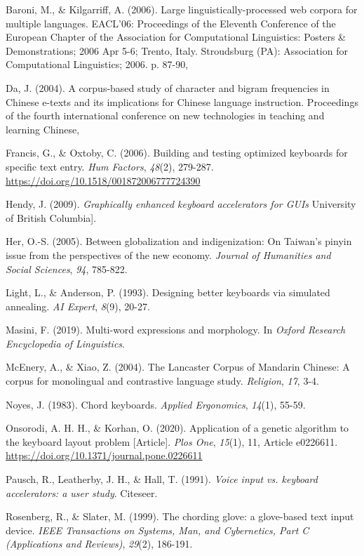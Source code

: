 Baroni, M., \& Kilgarriff, A. (2006). Large linguistically-processed web
corpora for multiple languages. EACL'06: Proceedings of the Eleventh
Conference of the European Chapter of the Association for Computational
Linguistics: Posters \& Demonstrations; 2006 Apr 5-6; Trento, Italy.
Stroudsburg (PA): Association for Computational Linguistics; 2006. p.
87-90,

Da, J. (2004). A corpus-based study of character and bigram frequencies
in Chinese e-texts and its implications for Chinese language
instruction. Proceedings of the fourth international conference on new
technologies in teaching and learning Chinese,

Francis, G., \& Oxtoby, C. (2006). Building and testing optimized
keyboards for specific text entry. \emph{Hum Factors}, \emph{48}(2),
279-287. \url{https://doi.org/10.1518/001872006777724390}

Hendy, J. (2009). \emph{Graphically enhanced keyboard accelerators for
GUIs} University of British Columbia{]}.

Her, O.-S. (2005). Between globalization and indigenization: On Taiwan's
pinyin issue from the perspectives of the new economy. \emph{Journal of
Humanities and Social Sciences}, \emph{94}, 785-822.

Light, L., \& Anderson, P. (1993). Designing better keyboards via
simulated annealing. \emph{AI Expert}, \emph{8}(9), 20-27.

Masini, F. (2019). Multi-word expressions and morphology. In
\emph{Oxford Research Encyclopedia of Linguistics}.

McEnery, A., \& Xiao, Z. (2004). The Lancaster Corpus of Mandarin
Chinese: A corpus for monolingual and contrastive language study.
\emph{Religion}, \emph{17}, 3-4.

Noyes, J. (1983). Chord keyboards. \emph{Applied Ergonomics},
\emph{14}(1), 55-59.

Onsorodi, A. H. H., \& Korhan, O. (2020). Application of a genetic
algorithm to the keyboard layout problem {[}Article{]}. \emph{Plos One},
\emph{15}(1), 11, Article e0226611.
\url{https://doi.org/10.1371/journal.pone.0226611}

Pausch, R., Leatherby, J. H., \& Hall, T. (1991). \emph{Voice input vs.
keyboard accelerators: a user study}. Citeseer.

Rosenberg, R., \& Slater, M. (1999). The chording glove: a glove-based
text input device. \emph{IEEE Transactions on Systems, Man, and
Cybernetics, Part C (Applications and Reviews)}, \emph{29}(2), 186-191.

